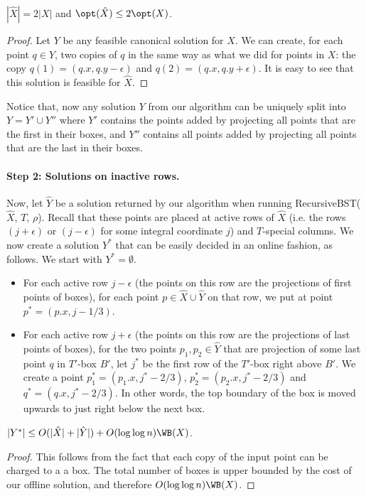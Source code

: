 \documentclass{toc}
\begin{document}
\begin{observation}
$|\hat{X}| = 2|X|$ and $\opt(\hat{X}) \leq 2 \opt(X)$. 
\end{observation} 
\begin{proof}
Let $Y$ be any feasible canonical solution for $X$. 
We can create, for each point $q \in Y$, two copies of $q$ in the same way as what we did for points in $X$: the copy $q(1) = (q.x, q.y- \epsilon)$ and $q(2) = (q.x, q.y+\epsilon)$. 
It is easy to see that this solution is feasible for $\hat{X}$.  
\end{proof} 
 
%
Notice that, now any solution $Y$ from our algorithm can be uniquely split into $Y = Y' \cup Y''$ where $Y'$ contains the points added by projecting all points that are the first in their boxes, and $Y''$ contains all points added by projecting all points that are the last in their boxes.
 

\paragraph*{Step 2: Solutions on inactive rows.} 
Now, let $\hat{Y}$ be a solution returned by our algorithm when running {\sc RecursiveBST}($\hat{X}$, $T$, $\rho$). 
Recall that these points are placed at active rows of $\hat{X}$ (i.e. the rows $(j+\epsilon)$ or $(j-\epsilon)$ for some integral coordinate $j$) and $T$-special columns. 
We now create a solution $Y^*$ that can be easily decided in an online fashion, as follows. We start with $Y^* = \emptyset$. 

\begin{itemize}
\item For each active row $j - \epsilon$ (the points on this row are the projections of first points of boxes), for each point $p \in \hat{X} \cup \hat{Y}$ on that row, we put at point $p^* = (p.x, j-1/3)$.  


\item For each active row $j+\epsilon$ (the points on this row are the projections of last points of boxes), for the two points $p_1, p_2 \in \hat{Y}$ that are projection of some last point $q$ in $T'$-box $B'$, let $j^*$ be the first row of the $T'$-box right above $B'$. We create a point $p^*_1 = (p_1.x, j^* - 2/3)$, $p^*_2 = (p_2.x, j^* - 2/3)$ and $q^* = (q.x, j^* - 2/3)$.
In other words, the top boundary of the box is moved upwards to just right below the next box.  
%
\end{itemize}  
%
%
  

\begin{lemma} 
$|Y^*| \leq O(|\hat{X}| + |\hat{Y}|) + O(\log \log n) \WB(X)$.   
\end{lemma} 
\begin{proof}
This follows from the fact that each copy of the input point can be charged to a a box. 
The total number of boxes is upper bounded by the cost of our offline solution, and therefore $O(\log \log n) \WB(X)$. 
\end{proof} 
\end{document}
